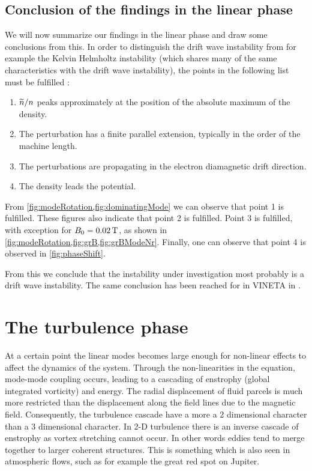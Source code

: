 \subsection{Conclusion of the findings in the linear phase}
%
We will now summarize our findings in the linear phase and draw some conclusions from this.
In order to distinguish the drift wave instability from for example the Kelvin Helmholtz instability (which shares many of the same characteristics with the drift wave instability), the points in the following list must be fulfilled \cite{Jassby1972,Hendel1968}:
%
\begin{enumerate}[noitemsep]
    \item $\widetilde{ n}/n$ peaks approximately at the position of the absolute maximum of the density.
    \item The perturbation has a finite parallel extension, typically in the order of the machine length.
    \item The perturbations are propagating in the electron diamagnetic drift direction.
    \item The density leads the potential.
\end{enumerate}
%
From \cref{fig:modeRotation,fig:dominatingMode} we can observe that point 1 is fulfilled.
These figures also indicate that point 2 is fulfilled.
Point 3 is fulfilled, with exception for $B_0=0.02\, \text{T}$, as shown in \cref{fig:modeRotation,fig:grB,fig:grBModeNr}.
Finally, one can observe that point 4 is observed in \cref{fig:phaseShift}.

From this we conclude that the instability under investigation most probably is a drift wave instability.
The same conclusion has been reached for in VINETA in \cite{Schroder2005}.

\section{The turbulence phase}
\label{sec:satTurb}
%
At a certain point the linear modes becomes large enough for non-linear effects to affect the dynamics of the system.
Through the non-linearities in the equation, mode-mode coupling occurs, leading to a cascading of enstrophy (global integrated vorticity) and energy.
The radial displacement of fluid parcels is much more restricted than the displacement along the field lines due to the magnetic field.
Consequently, the turbulence cascade have a more a 2 dimensional character than a 3 dimensional character.
In 2-D turbulence there is an inverse cascade of enstrophy as vortex stretching cannot occur.
In other words eddies tend to merge together to larger coherent structures.
This is something which is also seen in atmospheric flows, such as for example the great red spot on Jupiter.

